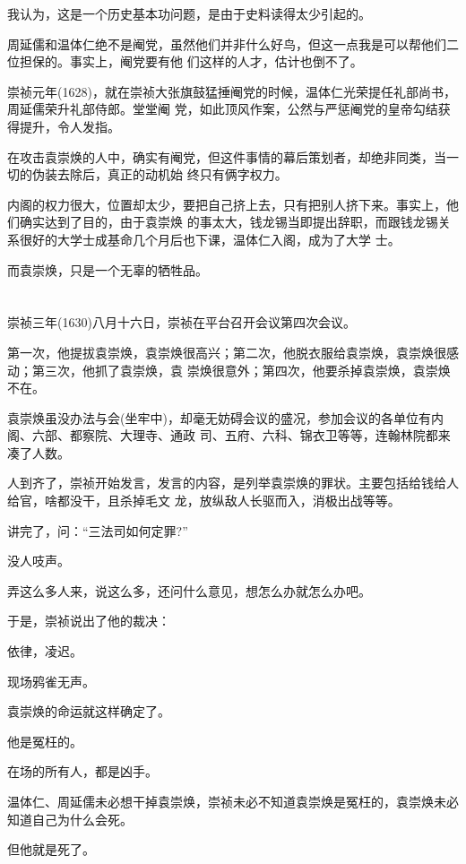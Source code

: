 \documentclass[11pt,a4paper,onecolumn]{article}
\begin{document}
我认为，这是一个历史基本功问题，是由于史料读得太少引起的。

周延儒和温体仁绝不是阉党，虽然他们并非什么好鸟，但这一点我是可以帮他们二位担保的。事实上，阉党要有他
们这样的人才，估计也倒不了。

崇祯元年(1628)，就在崇祯大张旗鼓猛捶阉党的时候，温体仁光荣提任礼部尚书，周延儒荣升礼部侍郎。堂堂阉
党，如此顶风作案，公然与严惩阉党的皇帝勾结获得提升，令人发指。

在攻击袁崇焕的人中，确实有阉党，但这件事情的幕后策划者，却绝非同类，当一切的伪装去除后，真正的动机始
终只有俩字\myrule 权力。

内阁的权力很大，位置却太少，要把自己挤上去，只有把别人挤下来。事实上，他们确实达到了目的，由于袁崇焕
的事太大，钱龙锡当即提出辞职，而跟钱龙锡关系很好的大学士成基命几个月后也下课，温体仁入阁，成为了大学
士。

而袁崇焕，只是一个无辜的牺牲品。

\section[\thesection]{}

崇祯三年(1630)八月十六日，崇祯在平台召开会议\myrule 第四次会议。

第一次，他提拔袁崇焕，袁崇焕很高兴；第二次，他脱衣服给袁崇焕，袁崇焕很感动；第三次，他抓了袁崇焕，袁
崇焕很意外；第四次，他要杀掉袁崇焕，袁崇焕不在。

袁崇焕虽没办法与会(坐牢中)，却毫无妨碍会议的盛况，参加会议的各单位有内阁、六部、都察院、大理寺、通政
司、五府、六科、锦衣卫等等，连翰林院都来凑了人数。

人到齐了，崇祯开始发言，发言的内容，是列举袁崇焕的罪状。主要包括给钱给人给官，啥都没干，且杀掉毛文
龙，放纵敌人长驱而入，消极出战等等。

讲完了，问：``三法司如何定罪?''

没人吱声。

弄这么多人来，说这么多，还问什么意见，想怎么办就怎么办吧。

于是，崇祯说出了他的裁决：

依律，凌迟。

现场鸦雀无声。

袁崇焕的命运就这样确定了。

他是冤枉的。

在场的所有人，都是凶手。

温体仁、周延儒未必想干掉袁崇焕，崇祯未必不知道袁崇焕是冤枉的，袁崇焕未必知道自己为什么会死。

但他就是死了。
\end{document}
